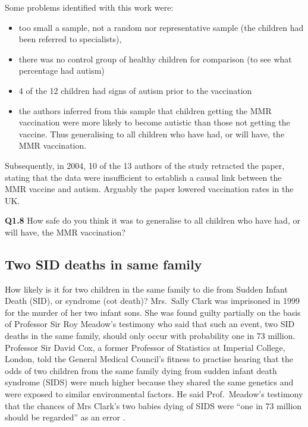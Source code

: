 \documentclass[
  oneside]{krantz}
\begin{document}
Some problems identified with this work were:

\begin{itemize}
\item
  too small a sample, not a random nor representative sample (the children had been referred to specialists),
\item
  there was no control group of healthy children for comparison (to see what percentage had autism)
\item
  4 of the 12 children had signs of autism prior to the vaccination
\item
  the authors inferred from this sample that children getting the MMR vaccination were more likely to become autistic than those not getting the vaccine. Thus generalising to all children who have had, or will have, the MMR vaccination.
\end{itemize}

Subsequently, in 2004, 10 of the 13 authors of the study retracted the paper, stating that the data were insufficient to establish a causal link between the MMR vaccine and autism. Arguably the paper lowered vaccination rates in the UK.

\textbf{Q1.8} How safe do you think it was to generalise to all children who have had, or will have, the MMR vaccination?

\hypertarget{two-sid-deaths-in-same-family}{%
\subsection{Two SID deaths in same family}\label{two-sid-deaths-in-same-family}}

How likely is it for two children in the same family to die from Sudden Infant Death (SID), or syndrome (cot death)? Mrs.~Sally Clark was imprisoned in 1999 for the murder of her two infant sons. She was found guilty partially on the basis of Professor Sir Roy Meadow's testimony who said that such an event, two SID deaths in the same family, should only occur with probability one in 73 million. Professor Sir David Cox, a former Professor of Statistics at Imperial College, London, told the General Medical Council's fitness to practise hearing that the odds of two children from the same family dying from sudden infant death syndrome (SIDS) were much higher because they shared the same genetics and were exposed to similar environmental factors. He said Prof.~Meadow's testimony that the chances of Mrs Clark's two babies dying of SIDS were ``one in 73 million should be regarded'' as an error \citep{sallyClarkGuardian}.
\end{document}
